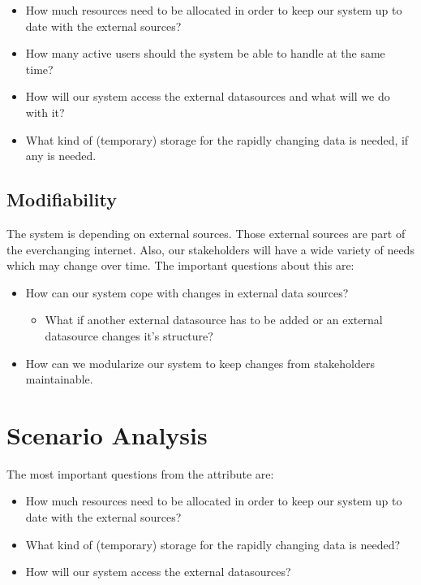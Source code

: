 \documentclass{article}
\begin{document}
\begin{itemize}
\item How much resources need to be allocated in order to keep our system up to date with the external sources?
\item How many active users should the system be able to handle at the same time?
\item How will our system access the external datasources and what will we do with it?
\item What kind of (temporary) storage for the rapidly changing data is needed, if any is needed.
\end{itemize}

\subsection*{Modifiability}
The system is depending on external sources. Those external sources are part of the everchanging internet. Also, our stakeholders will have a wide variety of needs which may change over time. The important questions about this are:

\begin{itemize}
\item How can our system cope with changes in external data sources?  
\begin{itemize}
\item What if another external datasource has to be added or an external datasource changes it's structure?
\end{itemize}
\item How can we modularize our system to keep changes from stakeholders maintainable.
\end{itemize}

\section*{Scenario Analysis}

The most important questions from the attribute are: 
\begin{itemize}
\item How much resources need to be allocated in order to keep our system up to date with the external sources?
\item What kind of (temporary) storage for the rapidly changing data is needed?
\item How will our system access the external datasources?
\end{itemize}
\end{document}
